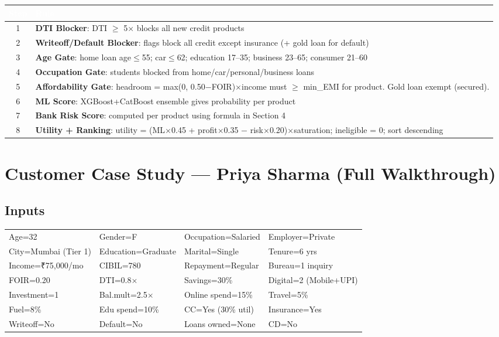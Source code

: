 \documentclass[12pt,a4paper]{article}
\begin{document}
\begin{center}
\begin{tabular}{|c|p{11.5cm}|}
\hline
\rowcolor{darkblue}\textcolor{white}{\textbf{Step}} & \textcolor{white}{\textbf{Rule}} \\
\hline
1 & \textbf{DTI Blocker}: DTI $\geq$ 5$\times$ blocks all new credit products \\
\hline
2 & \textbf{Writeoff/Default Blocker}: flags block all credit except insurance (+ gold loan for default) \\
\hline
3 & \textbf{Age Gate}: home loan age$\leq$55; car$\leq$62; education 17--35; business 23--65; consumer 21--60 \\
\hline
4 & \textbf{Occupation Gate}: students blocked from home/car/personal/business loans \\
\hline
5 & \textbf{Affordability Gate}: headroom = max(0, 0.50$-$FOIR)$\times$income must $\geq$ min\_EMI for product. Gold loan exempt (secured). \\
\hline
6 & \textbf{ML Score}: XGBoost+CatBoost ensemble gives probability per product \\
\hline
7 & \textbf{Bank Risk Score}: computed per product using formula in Section 4 \\
\hline
8 & \textbf{Utility + Ranking}: utility = (ML$\times$0.45 + profit$\times$0.35 $-$ risk$\times$0.20)$\times$saturation; ineligible = 0; sort descending \\
\hline
\end{tabular}
\end{center}

\newpage
\section{Customer Case Study — Priya Sharma (Full Walkthrough)}

\subsection{Inputs}

\begin{tabular}{llll}
\toprule
Age=32 & Gender=F & Occupation=Salaried & Employer=Private \\
City=Mumbai (Tier 1) & Education=Graduate & Marital=Single & Tenure=6 yrs \\
Income=₹75{,}000/mo & CIBIL=780 & Repayment=Regular & Bureau=1 inquiry \\
FOIR=0.20 & DTI=0.8$\times$ & Savings=30\% & Digital=2 (Mobile+UPI) \\
Investment=1 & Bal.mult=2.5$\times$ & Online spend=15\% & Travel=5\% \\
Fuel=8\% & Edu spend=10\% & CC=Yes (30\% util) & Insurance=Yes \\
Writeoff=No & Default=No & Loans owned=None & CD=No \\
\bottomrule
\end{tabular}
\end{document}
